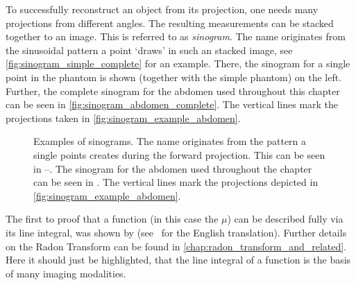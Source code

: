 To successfully reconstruct an object from its projection, one needs many projections from different
angles. The resulting measurements can be stacked together to an image. This is referred to as
\textit{sinogram}. The name originates from the sinusoidal pattern a point `draws' in such an
stacked image, see \autoref{fig:sinogram_simple_complete} for an example. There, the sinogram for a
single point in the phantom is shown (together with the simple phantom) on the left. Further, the
complete sinogram for the abdomen used throughout this chapter can be seen in
\autoref{fig:sinogram_abdomen_complete}. The vertical lines mark the projections taken in
\autoref{fig:sinogram_example_abdomen}.

\begin{figure}
	\centering
	\caption{Examples of sinograms. The name originates from the pattern a single points creates
		during the forward projection. This can be seen in
		--. The
		sinogram for the abdomen  used throughout the
		chapter can be seen in . The vertical lines
		mark the projections depicted in \autoref{fig:sinogram_example_abdomen}.
	}\label{fig:sinogram_complete}
\end{figure}

The first to proof that a function (in this case the \(\mu\)) can be described fully via its line
integral, was shown by \textcite{radon_uber_1917} (see~\cite{radon_determination_1986} for the
English translation). Further details on the Radon Transform can be found in
\autoref{chap:radon_transform_and_related}. Here it should just be highlighted, that the line
integral of a function is the basis of many imaging modalities.

